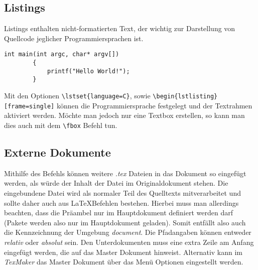 \documentclass[10pt]{scrartcl}  %
\begin{document}
    \subsection{Listings}
        Listings enthalten nicht-formatierten Text, der wichtig zur Darstellung von Quellcode jeglicher Programmiersprachen ist.
    \lstset{language=C}
    \begin{lstlisting}[frame=single]
        int main(int argc, char* argv[]) 
        {
            printf("Hello World!");
        }
    \end{lstlisting}
    Mit den Optionen \verb!\lstset{language=C}!, sowie \verb!\begin{lstlisting}[frame=single]! können die Programmiersprache festgelegt und der Textrahmen aktiviert werden.
    Möchte man jedoch nur eine Textbox erstellen, so kann man dies auch mit dem \verb!\fbox! Befehl tun.

    \subsection{Externe Dokumente}
        Mithilfe des \verb!! Befehls können weitere \emph{.tex} Dateien in das Dokument so eingefügt werden, als würde der Inhalt der Datei im Originaldokument stehen.
        Die eingebundene Datei wird als normaler Teil des Quelltexts mitverarbeitet und sollte daher auch aus \LaTeX \@ Befehlen bestehen.
        Hierbei muss man allerdings beachten, dass die Präambel nur im Hauptdokument definiert werden darf (Pakete werden also nur im Hauptdokument geladen).
        Somit entfällt also auch die Kennzeichnung der Umgebung \emph{document}.
        Die Pfadangaben können entweder \emph{relativ} oder \emph{absolut} sein. Den Unterdokumenten muss eine extra Zeile am Anfang eingefügt werden, die auf das Master Dokument hinweist. Alternativ kann im \emph{TexMaker}
        das Master Dokument über das Menü Optionen eingestellt werden.
\end{document}
